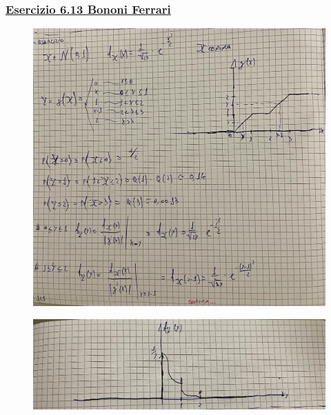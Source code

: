 \documentclass{article}
\begin{document}
\subsubsection{\underline{Esercizio 6.13 Bononi Ferrari}}
\begin{figure}[H]
\centering
\includegraphics[scale=0.10]{ese/33.jpeg}
\end{figure}
\begin{figure}[H]
\centering
\includegraphics[scale=0.10]{ese/33a.jpeg}
\end{figure}
\end{document}
